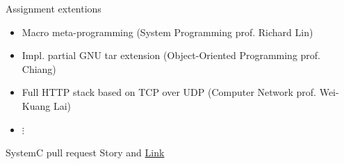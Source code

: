 \documentclass{beamer}
\begin{document}
\begin{frame}{Assignment extentions}
    \begin{itemize}
        \item Macro meta-programming (System Programming prof. Richard Lin)
        \item Impl. partial GNU tar extension (Object-Oriented Programming prof. Chiang)
        \item Full HTTP stack based on TCP over UDP (Computer Network prof. Wei-Kuang Lai)
        \item $\vdots$
    \end{itemize}
\end{frame}

\begin{frame}{SystemC pull request}
    Story and \href{https://github.com/accellera-official/systemc/pull/25}{Link}
\end{frame}
\end{document}
